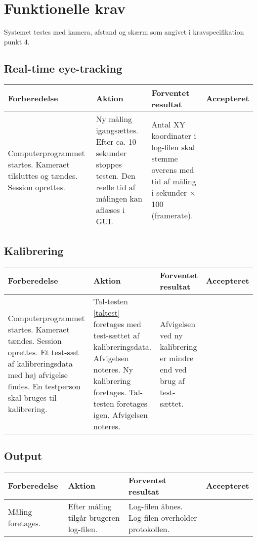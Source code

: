 \documentclass[accepttest.tex]{subfiles}
\begin{document}
	\section{Funktionelle krav}
Systemet testes med kamera, afstand og skærm som angivet i kravspecifikation punkt 4.
\subsection{Real-time eye-tracking}
\begin{table}[H]
	\small
\begin{tabular}{|p{3.5cm}|p{3.5cm}|p{3.5cm}|l|}
	\hline Forberedelse & Aktion & Forventet resultat & Accepteret \\ 
	\hline Computerprogrammet startes. Kameraet tilsluttes og tændes. Session oprettes. & Ny måling igangsættes. Efter ca. 10 sekunder stoppes testen. Den reelle tid af målingen kan aflæses i GUI. & Antal XY koordinater i log-filen skal stemme overens med tid af måling i sekunder $ \times $ 100 (framerate). &  \\ 
	\hline 
\end{tabular} 
\end{table}

\begin{table}[H]
	\small
\subsection{Kalibrering}
\begin{tabular}{|p{3.5cm}|p{3.5cm}|p{3.5cm}|l|}
	\hline Forberedelse & Aktion & Forventet resultat & Accepteret \\ 
	\hline Computerprogrammet startes. Kameraet tændes. Session oprettes. Et test-sæt af kalibreringsdata med høj afvigelse findes. En testperson skal bruges til kalibrering.  & 
	Tal-testen \ref{taltest} foretages med test-sættet af kalibreringsdata. Afvigelsen noteres. Ny kalibrering foretages. Tal-testen foretages igen. Afvigelsen noteres. & 
	Afvigelsen ved ny kalibrering er mindre end ved brug af test-sættet.  &  \\ 
	\hline 
\end{tabular} 
\end{table}

\subsection{Output}
\begin{table}[H]
	\small
\begin{tabular}{|p{3.5cm}|p{3.5cm}|p{3.5cm}|l|}
	\hline Forberedelse & Aktion & Forventet resultat & Accepteret \\ 
	\hline Måling foretages. & Efter måling tilgår brugeren log-filen. & Log-filen åbnes. Log-filen overholder protokollen. &  \\ 
	\hline 
\end{tabular} 
\end{table}
\end{document}
